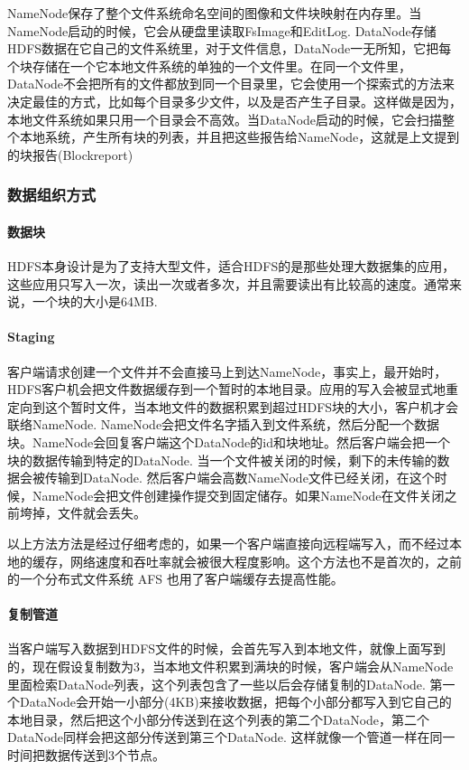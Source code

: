 \documentclass[UTF8]{ctexart}
\begin{document}
NameNode保存了整个文件系统命名空间的图像和文件块映射在内存里。当NameNode启动的时候，它会从硬盘里读取FsImage和EditLog. DataNode存储HDFS数据在它自己的文件系统里，对于文件信息，DataNode一无所知，它把每个块存储在一个它本地文件系统的单独的一个文件里。在同一个文件里，DataNode不会把所有的文件都放到同一个目录里，它会使用一个探索式的方法来决定最佳的方式，比如每个目录多少文件，以及是否产生子目录。这样做是因为，本地文件系统如果只用一个目录会不高效。当DataNode启动的时候，它会扫描整个本地系统，产生所有块的列表，并且把这些报告给NameNode，这就是上文提到的块报告(Blockreport)

\subsubsection{数据组织方式}
\paragraph{数据块}
HDFS本身设计是为了支持大型文件，适合HDFS的是那些处理大数据集的应用，这些应用只写入一次，读出一次或者多次，并且需要读出有比较高的速度。通常来说，一个块的大小是64MB.

\paragraph{Staging}
客户端请求创建一个文件并不会直接马上到达NameNode，事实上，最开始时，HDFS客户机会把文件数据缓存到一个暂时的本地目录。应用的写入会被显式地重定向到这个暂时文件，当本地文件的数据积累到超过HDFS块的大小，客户机才会联络NameNode. NameNode会把文件名字插入到文件系统，然后分配一个数据块。NameNode会回复客户端这个DataNode的id和块地址。然后客户端会把一个块的数据传输到特定的DataNode. 当一个文件被关闭的时候，剩下的未传输的数据会被传输到DataNode. 然后客户端会高数NameNode文件已经关闭，在这个时候，NameNode会把文件创建操作提交到固定储存。如果NameNode在文件关闭之前垮掉，文件就会丢失。

以上方法方法是经过仔细考虑的，如果一个客户端直接向远程端写入，而不经过本地的缓存，网络速度和吞吐率就会被很大程度影响。这个方法也不是首次的，之前的一个分布式文件系统 AFS 也用了客户端缓存去提高性能。

\paragraph{复制管道}
当客户端写入数据到HDFS文件的时候，会首先写入到本地文件，就像上面写到的，现在假设复制数为3，当本地文件积累到满块的时候，客户端会从NameNode里面检索DataNode列表，这个列表包含了一些以后会存储复制的DataNode. 第一个DataNode会开始一小部分(4KB)来接收数据，把每个小部分都写入到它自己的本地目录，然后把这个小部分传送到在这个列表的第二个DataNode，第二个DataNode同样会把这部分传送到第三个DataNode. 这样就像一个管道一样在同一时间把数据传送到3个节点。
\end{document}
